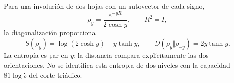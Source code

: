 Para una involución de dos hojas con un autovector de cada signo,
\[
\rho_y=\frac{e^{-yR}}{2\cosh y},\qquad R^2=I,
\]
la diagonalización proporciona
\[
S(\rho_y)=\log(2\cosh y)-y\tanh y,\qquad
D(\rho_y\Vert\rho_{-y})=2y\tanh y.
\]
La entropía es par en $y$; la distancia compara explícitamente
las dos orientaciones. No se identifica esta entropía de dos niveles
con la capacidad $81\log3$ del corte triádico.

